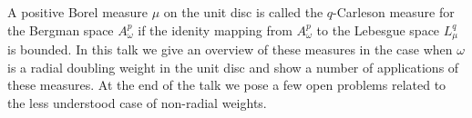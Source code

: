 {%
    A positive Borel measure $\mu$ on the unit disc is called the
    $q$-Carleson measure for the Bergman space $A^p_\omega$ if
    the idenity mapping from $A^p_\omega$ to the Lebesgue space
    $L^q_\mu$ is bounded. In this talk we give an overview of these
    measures in the case when $\omega$ is a radial doubling weight
    in the unit disc and show a number of applications of these
    measures. At the end of the talk we pose a few open problems
    related to the less understood case of non-radial weights.
}


